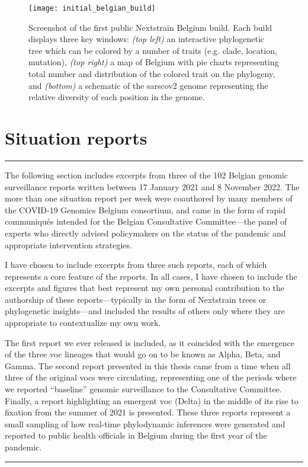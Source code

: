 \begin{figure}[ht]
  \centering
  \texttt{[image: initial\_belgian\_build]}
  \caption[First Belgian Nextstrain instance]{Screenshot of the first public Nextstrain Belgium build. Each build displays three key windows: \textit{(top left)} an interactive phylogenetic tree which can be colored by a number of traits (e.g. clade, location, mutation), \textit{(top right)} a map of Belgium with pie charts representing total number and distribution of the colored trait on the phylogeny, and \textit{(bottom)} a schematic of the \gls{sarscov2} genome representing the relative diversity of each position in the genome.}
  \label{fig:firstBeBuild}
\end{figure}

\section{Situation reports}\label{sec:sitRep}
\singlespacing
\hrule
\vspace*{12pt}
The following section includes excerpts from three of the 102 Belgian genomic surveillance reports written between 17 January 2021 and 8 November 2022.
The more than one situation report per week were coauthored by many members of the COVID-19 Genomics Belgium consortium, and came in the form of rapid communiqu\'{e}s intended for the Belgian Consultative Committee---the panel of experts who directly advised policymakers on the status of the pandemic and appropriate intervention strategies.

I have chosen to include excerpts from three such reports, each of which represents a core feature of the reports.
In all cases, I have chosen to include the excerpts and figures that best represent my own personal contribution to the authorship of these reports---typically in the form of Nextstrain trees or phylogenetic insights---and included the results of others only where they are appropriate to contextualize my own work.

The first report we ever released is included, as it coincided with the emergence of the three \gls{voc} lineages that would go on to be known as Alpha, Beta, and Gamma.
The second report presented in this thesis came from a time when all three of the original \gls{voc}s were circulating, representing one of the periods where we reported ``baseline'' genomic surveillance to the Consultative Committee.
Finally, a report highlighting an emergent \gls{voc} (Delta) in the middle of its rise to fixation from the summer of 2021 is presented.
These three reports represent a small sampling of how real-time phylodynamic inferences were generated and reported to public health officials in Belgium during the first year of the pandemic.
\vspace*{12pt}
\hrule
\onehalfspacing

